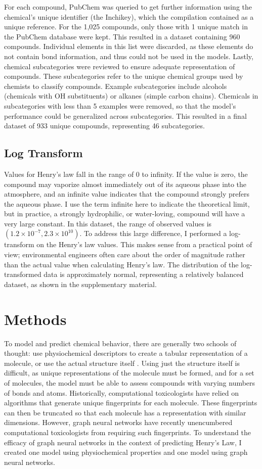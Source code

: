\documentclass[12pt, oneside]{article}   	%
\begin{document}
For each compound, PubChem was queried to get further information using the chemical's unique identifier (the Inchikey), which the compilation contained as a unique reference. For the 1,025 compounds, only those with 1 unique match in the PubChem database were kept. This resulted in a dataset containing 960 compounds. Individual elements in this list were discarded, as these elements do not contain bond information, and thus could not be used in the models. Lastly, chemical subcategories were reviewed to ensure adequate representation of compounds. These subcategories refer to the unique chemical groups used by chemists to classify compounds. Example subcategories include alcohols (chemicals with OH substituents) or alkanes (simple carbon chains). Chemicals in subcategories with less than 5 examples were removed, so that the model's performance could be generalized across subcategories. This resulted in a final dataset of 933 unique compounds, representing 46 subcategories. 

\subsection{Log Transform}
Values for Henry's law fall in the range of 0 to infinity. If the value is zero, the compound may vaporize almost immediately out of its aqueous phase into the atmosphere, and an infinite value indicates that the compound strongly prefers the aqueous phase. I use the term infinite here to indicate the theoretical limit, but in practice, a strongly hydrophilic, or water-loving, compound will have a very large constant. In this dataset, the range of observed values is $(1.2\times10^{-7}, 2.3\times 10^{10})$. To address this large difference, I performed a log-transform on the Henry's law values. This makes sense from a practical point of view; environmental engineers often care about the order of magnitude rather than the actual value when calculating Henry's law. The distribution of the log-transformed data is approximately normal, representing a relatively balanced dataset, as shown in the supplementary material.

\section{Methods}
To model and predict chemical behavior, there are generally two schools of thought: use physiochemical descriptors to create a tabular representation of a molecule, or use the actual structure itself \cite{Ramsundar-et-al-2019}. Using just the structure itself is difficult, as unique representations of the molecule must be formed, and for a set of molecules, the model must be able to assess compounds with varying numbers of bonds and atoms. Historically, computational toxicologists have relied on algorithms that generate unique fingerprints for each molecule. These fingerprints can then be truncated so that each molecule has a representation with similar dimensions. However, graph neural networks have recently unencumbered computational toxicologists from requiring such fingerprints. To understand the efficacy of graph neural networks in the context of predicting Henry's Law, I created one model using physiochemical properties and one model using graph neural networks.
\end{document}
